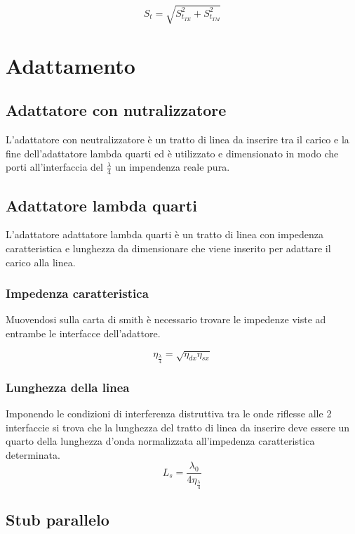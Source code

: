 \documentclass[10pt,a4paper]{report}
\begin{document}
		\[
		S_{t}=\sqrt{S_{t_{TE}}^2 +S_{t_{TM}}^2 }
		\]

\chapter{Adattamento}

	\section{Adattatore con nutralizzatore}

		L'adattatore con neutralizzatore è un tratto di linea da inserire tra il carico e la fine dell'adattatore lambda quarti ed è utilizzato e dimensionato in modo che porti all'interfaccia del $\frac{\lambda}{4}$ un impendenza reale pura.

	\section{Adattatore lambda quarti}
		
		L'adattatore adattatore lambda quarti è un tratto di linea con impedenza caratteristica e lunghezza da dimensionare che viene inserito per adattare il carico alla linea.

		\subsection{Impedenza caratteristica}
				Muovendosi sulla carta di smith è necessario trovare le impedenze viste ad entrambe le interfacce dell'adattore.

				\begin{equation}
				\eta_{\frac{\lambda}{4}}=\sqrt{\eta_{dx}\eta_{sx}}
				\end{equation}

		\subsection{Lunghezza della linea}
				Imponendo le condizioni di interferenza distruttiva tra le onde riflesse alle 2 interfaccie si trova che la lunghezza del tratto di linea da inserire deve essere un quarto della lunghezza d'onda normalizzata all'impedenza caratteristica determinata.
				\begin{equation}
				L_s=\frac{\lambda_0}{4\eta_{\frac{\lambda}{4}}}
				\end{equation}

	\section{Stub parallelo}
\end{document}
